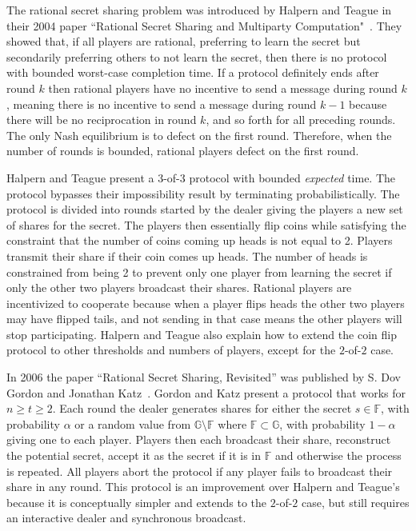 \documentclass[12pt]{dalcsthesis}
\begin{document}
The rational secret sharing problem was introduced by Halpern and Teague in their 2004 paper ``Rational Secret Sharing and Multiparty Computation"~\cite{halpern04}. They showed that, if all players are rational, preferring to learn the secret but secondarily preferring others to not learn the secret, then there is no protocol with bounded worst-case completion time. If a protocol definitely ends after round $k$ then rational players have no incentive to send a message during round $k$, meaning there is no incentive to send a message during round $k-1$ because there will be no reciprocation in round $k$, and so forth for all preceding rounds. The only Nash equilibrium is to defect on the first round. Therefore, when the number of rounds is bounded, rational players defect on the first round.

Halpern and Teague present a 3-of-3 protocol with bounded \emph{expected} time. The protocol bypasses their impossibility result by terminating probabilistically. The protocol is divided into rounds started by the dealer giving the players a new set of shares for the secret. The players then essentially flip coins while satisfying the constraint that the number of coins coming up heads is not equal to 2. Players transmit their share if their coin comes up heads. The number of heads is constrained from being 2 to prevent only one player from learning the secret if only the other two players broadcast their shares. Rational players are incentivized to cooperate because when a player flips heads the other two players may have flipped tails, and not sending in that case means the other players will stop participating. Halpern and Teague also explain how to extend the coin flip protocol to other thresholds and numbers of players, except for the $2$-of-$2$ case.

In 2006 the paper ``Rational Secret Sharing, Revisited'' was published by S. Dov Gordon and Jonathan Katz~\cite{gordon06}. Gordon and Katz present a protocol that works for $n \geq t \geq 2$. Each round the dealer generates shares for either the secret $s \in \mathbb{F}$, with probability $\alpha$ or a random value from $\mathbb{G} \setminus \mathbb{F}$ where $\mathbb{F} \subset \mathbb{G}$, with probability $1-\alpha$ giving one to each player. Players then each broadcast their share, reconstruct the potential secret, accept it as the secret if it is in $\mathbb{F}$ and otherwise the process is repeated. All players abort the protocol if any player fails to broadcast their share in any round. This protocol is an improvement over Halpern and Teague's because it is conceptually simpler and extends to the $2$-of-$2$ case, but still requires an interactive dealer and synchronous broadcast. 
\end{document}
